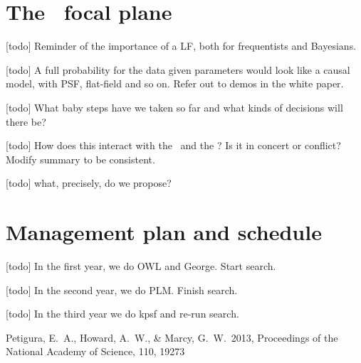\documentclass[letterpaper,12pt,preprint]{hack_aastex}
\begin{document}
\section{The \Kepler\ focal plane}

[todo] Reminder of the importance of a LF, both for frequentists and Bayesians.

[todo] A full probability for the data given parameters would look like a causal model, with PSF, flat-field and so on.  Refer out to demos in the white paper.

[todo] What baby steps have we taken so far and what kinds of decisions will there be?

[todo] How does this interact with the \PLM\ and the \OWL?  Is it in concert or conflict?  Modify summary to be consistent.

[todo] what, precisely, do we propose?

\section{Management plan and schedule}

[todo] In the first year, we do OWL and George.  Start search.

[todo] In the second year, we do PLM.  Finish search.

[todo] In the third year we do kpsf and re-run search.

\clearpage
\begin{thebibliography}{}\raggedright%

Petigura, E.~A., Howard, A.~W., \& Marcy, G.~W.\ 2013,
Proceedings of the National Academy of Science, 110, 19273

\end{thebibliography}
\end{document}
